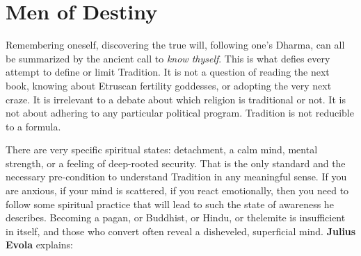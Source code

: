 \section{Men of Destiny}

Remembering oneself, discovering the true will, following one's Dharma, can all be summarized by the ancient call to \emph{know thyself}. This is what defies every attempt to define or limit Tradition. It is not a question of reading the next book, knowing about Etruscan fertility goddesses, or adopting the very next craze. It is irrelevant to a debate about which religion is traditional or not. It is not about adhering to any particular political program. Tradition is not reducible to a formula.

There are very specific spiritual states: detachment, a calm mind, mental strength, or a feeling of deep-rooted security. That is the only standard and the necessary pre-condition to understand Tradition in any meaningful sense. If you are anxious, if your mind is scattered, if you react emotionally, then you need to follow some spiritual practice that will lead to such the state of awareness he describes. Becoming a pagan, or Buddhist, or Hindu, or thelemite is insufficient in itself, and those who convert often reveal a disheveled, superficial mind. \textbf{Julius Evola} explains:

